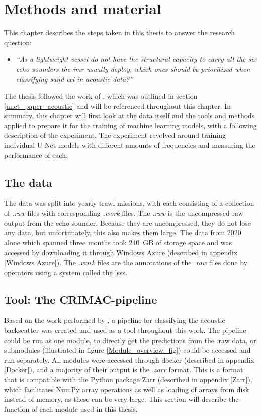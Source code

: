 \chapter{Methods and material}
    This chapter describes the steps taken in this thesis to answer the research question:
        \begin{itemize}
            \item \textit{“As a lightweight vessel do not have the structural capacity to carry all the six echo sounders the \gls{imr} usually deploy, which ones should be prioritized when classifying sand eel in acoustic data?”}
        \end{itemize}
    
    The thesis followed the work of \citeauthor{brautaset2020acoustic}\cite{brautaset2020acoustic}, which was outlined in section \ref{unet_paper_acoustic} and will be referenced throughout this chapter. In summary, this chapter will first look at the data itself and the tools and methods applied to prepare it for the training of machine learning models, with a following description of the experiment. The experiment revolved around training individual U-Net models with different amounts of frequencies and measuring the performance of each.
    
    \section{The data}
        The data was split into yearly trawl missions, with each consisting of a collection of \textit{.raw} files with corresponding \textit{.work} files. The \textit{.raw} is the uncompressed raw output from the echo sounder. Because they are uncompressed, they do not lose any data, but unfortunately, this also makes them large. The data from 2020 alone which spanned three months took 240 GB of storage space and was accessed by downloading it through Windows Azure (described in appendix \ref{Windows Azure}). The \textit{.work} files are the annotations of the \textit{.raw} files done by operators using a system called the \Gls{lsss}\cite{lsss}. 
    
    \section{Tool: The CRIMAC-pipeline}
        Based on the work performed by \citeauthor{brautaset2020acoustic}\cite{brautaset2020acoustic}, a pipeline for classifying the acoustic backscatter was created\cite{crimac_pipeline} and used as a tool throughout this work. The pipeline could be run as one module, to directly get the predictions from the .raw data, or submodules (illustrated in figure \ref{Module_overview_fig}) could be accessed and run separately. All modules were accessed through docker (described in appendix \ref{Docker}), and a majority of their output is the \textit{.zarr} format. This is a format that is compatible with the Python package Zarr (described in appendix \ref{Zarr}), which facilitates NumPy array operations as well as loading of arrays from disk instead of memory, as these can be very large. This section will describe the function of each module used in this thesis.
        
